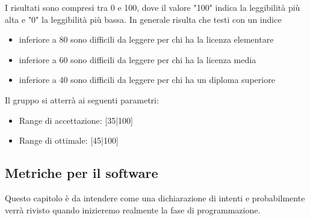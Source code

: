 \documentclass[a4paper]{report}
\begin{document}
				I risultati sono compresi tra 0 e 100, dove il valore "100" indica la leggibilità più alta e "0" la leggibilità
				più bassa. In generale risulta che testi con un indice
				\begin{itemize}
					\item inferiore a 80 sono difficili da leggere per chi ha la licenza elementare
					\item inferiore a 60 sono difficili da leggere per chi ha la licenza media
					\item inferiore a 40 sono difficili da leggere per chi ha un diploma superiore
				\end{itemize}
	
				Il gruppo si atterrà ai seguenti parametri:
				\begin{itemize}
					\item Range di accettazione: [35|100]
					\item Range di ottimale: [45|100]
				\end{itemize}
				
				
			
			\subsection{Metriche per il software}
				Questo capitolo è da intendere come una dichiarazione di intenti e probabilmente verrà rivisto quando inizieremo 
				realmente la fase di programmazione.
\end{document}
